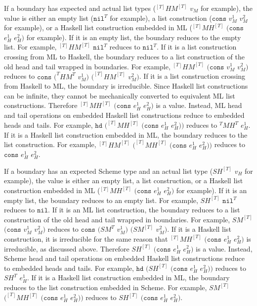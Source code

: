 If a boundary has expected and actual list types ($^{[T]}HM^{[T]}$ $v_{M}$ for example), the value is either an empty list ($\mathtt{nil}^{T}$ for example), a list construction ($\mathtt{cons}$ $v_{M}^{1}$ $v_{M}^{2}$ for example), or a Haskell list construction embedded in ML ($^{[T]}MH^{[T]}$ $(\mathtt{cons}$ $e_{H}^{1}$ $e_{H}^{2})$ for example).  If it is an empty list, the boundary reduces to the empty list.  For example, $^{[T]}HM^{[T]}$ $\mathtt{nil}^{T}$ reduces to $\mathtt{nil}^{T}$.  If it is a list construction crossing from ML to Haskell, the boundary reduces to a list construction of the old head and tail wrapped in boundaries.  For example, $^{[T]}HM^{[T]}$ $(\mathtt{cons}$ $v_{M}^{1}$ $v_{M}^{2})$ reduces to $\mathtt{cons}$ $(^{T}HM^{T}$ $v_{M}^{1})$ $(^{[T]}HM^{[T]}$ $v_{M}^{2})$.  If it is a list construction crossing from Haskell to ML, the boundary is irreducible.  Since Haskell list constructions can be infinite, they cannot be mechanically converted to equivalent ML list constructions.  Therefore $^{[T]}MH^{[T]}$ $(\mathtt{cons}$ $e_{H}^{1}$ $e_{H}^{2})$ is a value.  Instead, ML head and tail operations on embedded Haskell list constructions reduce to embedded heads and tails.  For example, $\mathtt{hd}$ $(^{[T]}MH^{[T]}$ $(\mathtt{cons}$ $e_{H}^{1}$ $e_{H}^{2}))$ reduces to $^{T}MH^{T}$ $e_{H}^{1}$.  If it is a Haskell list construction embedded in ML, the boundary reduces to the list construction.  For example, $^{[T]}HM^{[T]}$ $(^{[T]}MH^{[T]}$ $(\mathtt{cons}$ $e_{H}^{1}$ $e_{H}^{2}))$ reduces to $\mathtt{cons}$ $e_{H}^{1}$ $e_{H}^{2}$.

If a boundary has an expected Scheme type and an actual list type ($SH^{[T]}$ $v_{H}$ for example), the value is either an empty list, a list construction, or a Haskell list construction embedded in ML ($^{[T]}MH^{[T]}$ $(\mathtt{cons}$ $e_{H}^{1}$ $e_{H}^{2})$ for example).  If it is an empty list, the boundary reduces to an empty list.  For example, $SH^{[T]}$ $\mathtt{nil}^{T}$ reduces to $\mathtt{nil}$.  If it is an ML list construction, the boundary reduces to a list construction of the old head and tail wrapped in boundaries.  For example, $SM^{[T]}$ $(\mathtt{cons}$ $v_{M}^{1}$ $v_{M}^{2})$ reduces to $\mathtt{cons}$ $(SM^{T}$ $v_{M}^{1})$ $(SM^{[T]}$ $v_{M}^{2})$.  If it is a Haskell list construction, it is irreducible for the same reason that $^{[T]}MH^{[T]}$ $(\mathtt{cons}$ $e_{H}^{1}$ $e_{H}^{2})$ is irreducible, as discussed above.  Therefore $SH^{[T]}$ $(\mathtt{cons}$ $e_{H}^{1}$ $e_{H}^{2})$ is a value.  Instead, Scheme head and tail operations on embedded Haskell list constructions reduce to embedded heads and tails.  For example, $\mathtt{hd}$ $(SH^{[T]}$ $(\mathtt{cons}$ $e_{H}^{1}$ $e_{H}^{2}))$ reduces to $SH^{T}$ $e_{H}^{1}$.  If it is a Haskell list construction embedded in ML, the boundary reduces to the list construction embedded in Scheme.  For example, $SM^{[T]}$ $(^{[T]}MH^{[T]}$ $(\mathtt{cons}$ $e_{H}^{1}$ $e_{H}^{2}))$ reduces to $SH^{[T]}$ $(\mathtt{cons}$ $e_{H}^{1}$ $e_{H}^{2})$.

